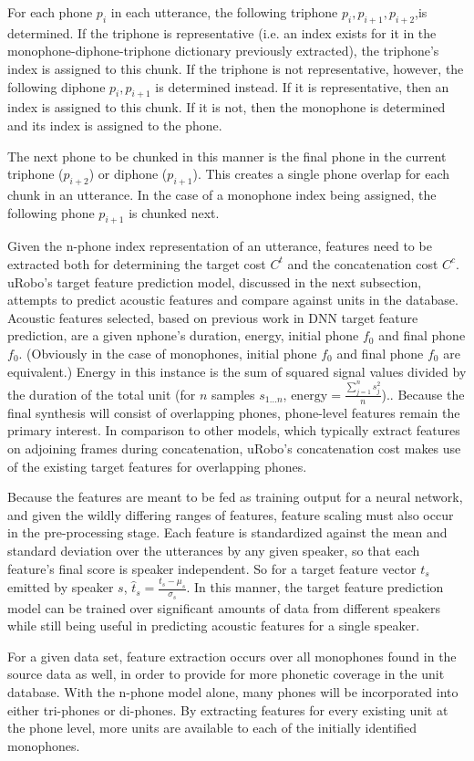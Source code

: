 \documentclass[10pt, journal, compsoc]{IEEEtran}
\begin{document}
For each phone $p_i$ in each utterance, the following triphone $p_i,p_{i+1},p_{i+2}$,is determined. If the triphone is representative (i.e. an index exists for it in the monophone-diphone-triphone dictionary previously extracted), the triphone's index is assigned to this chunk. If the triphone is not representative, however, the following diphone $p_i,p_{i+1}$ is determined instead. If it is representative, then an index is assigned to this chunk. If it is not, then the monophone is determined and its index is assigned to the phone.\par
The next phone to be chunked in this manner is the final phone in the current triphone ($p_{i+2}$) or diphone ($p_{i+1}$). This creates a single phone overlap for each chunk in an utterance. In the case of a monophone index being assigned, the following phone $p_{i+1}$ is chunked next.\par
Given the n-phone index representation of an utterance, features need to be extracted both for determining the target cost $C^t$ and the concatenation cost $C^c$. uRobo's target feature prediction model, discussed in the next subsection, attempts to predict acoustic features and compare against units in the database. Acoustic features selected, based on previous work in DNN target feature prediction, are a given nphone's duration, energy, initial phone $f_0$ and final phone $f_0$. (Obviously in the case of monophones, initial phone $f_0$ and final phone $f_0$ are equivalent.) Energy in this instance is the sum of squared signal values divided by the duration of the total unit (for $n$ samples $s_{1...n}$, $\textrm{energy}=\frac{\sum_{j=1}^n s_j^2}{n}$).\cite{Jurafsky:2009:SLP:1214993}. Because the final synthesis will consist of overlapping phones, phone-level features remain the primary interest. In comparison to other models, which typically extract features on adjoining frames during concatenation\cite{a102c4924c19470ab180d278d2029de5}, uRobo's concatenation cost makes use of the existing target features for overlapping phones.\par
Because the features are meant to be fed as training output for a neural network, and given the wildly differing ranges of features, feature scaling must also occur in the pre-processing stage. Each feature is standardized against the mean and standard deviation over the utterances by any given speaker, so that each feature's final score is speaker independent. So for a target feature vector $t_{s}$ emitted by speaker $s$, $\hat{t}_s=\frac{t_s-\mu_s}{\sigma_s}$\cite{Beigi:2011:FSR:2124400}. In this manner, the target feature prediction model can be trained over significant amounts of data from different speakers while still being useful in predicting acoustic features for a single speaker.\par
For a given data set, feature extraction occurs over all monophones found in the source data as well, in order to provide for more phonetic coverage in the unit database. With the n-phone model alone, many phones will be incorporated into either tri-phones or di-phones. By extracting features for every existing unit at the phone level, more units are available to each of the initially identified monophones.
\end{document}
